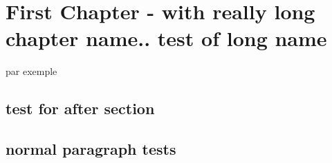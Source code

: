 \chapter{First Chapter - with really long chapter name.. test of long name}
\pagebreak
\begin{paragraph}[color=red,size=\tiny][V][oico]
par exemple
\blindtext
\bfseries{\blindtext}
\end{paragraph}
\begin{paragraph}[background=orange,headingColor=blue,heading=should overide lettrine needs warning,headingStyle=\slshape][U][seless]
\blindtext
\end{paragraph}
\begin{paragraph}[background=blue]
\blindtext
\end{paragraph}
\section{test for after section}
\begin{paragraph}
\blindtext
\end{paragraph}
\begin{paragraph}
\blindtext
\end{paragraph}
\begin{paragraph}[heading=should cause a line skip]
\blindtext
\end{paragraph}
\section{normal paragraph tests}
\blindtext

\blindtext

\blindtext

\blindtext